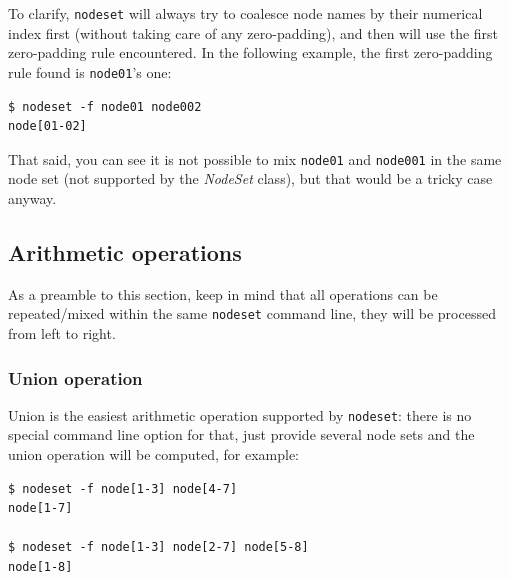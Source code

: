 \documentclass[english,a4paper]{csuserguide}
\newcommand{\NodeSet}{\textit{NodeSet}\xspace}
\newcommand{\nodeset}{\texttt{nodeset}\xspace}
\begin{document}
To clarify, \nodeset will always try to coalesce node names by their numerical index first (without taking care of any zero-padding), and then will use the first zero-padding rule encountered. In the following example, the first zero-padding rule found is \verb+node01+'s one:
\medskip
\begin{lstlisting}[breaklines=true, breakatwhitespace=true]
$ nodeset -f node01 node002
node[01-02]
\end{lstlisting}

That said, you can see it is not possible to mix \verb+node01+ and \verb+node001+ in the same node set (not supported by the \NodeSet class), but that would be a tricky case anyway.


\subsection{Arithmetic operations}
\label{nodeset-arithmetic}

As a preamble to this section, keep in mind that all operations can be repeated/mixed within the same \nodeset command line, they will be processed from left to right.

\subsubsection{Union operation}
Union is the easiest arithmetic operation supported by \nodeset: there is no special command line option for that, just provide several node sets and the union operation will be computed, for example:
\medskip
\begin{lstlisting}[breaklines=true, breakatwhitespace=true]
$ nodeset -f node[1-3] node[4-7]
node[1-7]

$ nodeset -f node[1-3] node[2-7] node[5-8]  
node[1-8]
\end{lstlisting}
\end{document}
